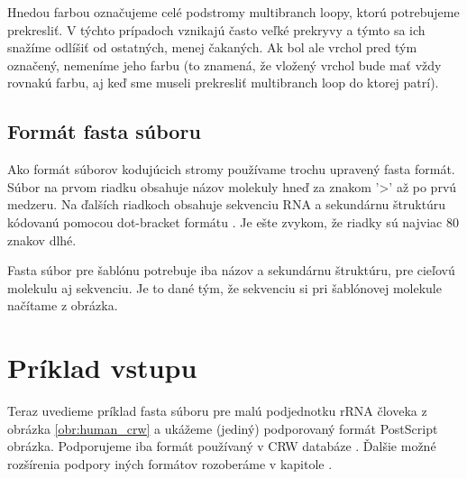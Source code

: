 Hnedou farbou označujeme celé podstromy multibranch loopy, ktorú potrebujeme
prekresliť. V týchto prípadoch vznikajú často veľké prekryvy a týmto
sa ich snažíme odlíšiť od ostatných, menej čakaných.
Ak bol ale vrchol pred tým označený, nemeníme jeho farbu (to znamená, že vložený vrchol
bude mať vždy rovnakú farbu, aj keď sme museli prekresliť multibranch loop do ktorej patrí).





\subsection{Formát fasta súboru}

Ako formát súborov kodujúcich stromy používame trochu upravený fasta formát.
Súbor na prvom riadku obsahuje názov molekuly hneď za znakom '>' až po prvú medzeru.
Na ďalších riadkoch obsahuje sekvenciu RNA a sekundárnu štruktúru kódovanú
pomocou dot-bracket formátu .
Je ešte zvykom, že riadky sú najviac 80 znakov dlhé.

Fasta súbor pre šablónu potrebuje iba názov a sekundárnu štruktúru,
pre cieľovú molekulu aj sekvenciu. Je to dané tým, že sekvenciu
si pri šablónovej molekule načítame z obrázka.



\section{Príklad vstupu}

Teraz uvedieme príklad fasta súboru pre malú podjednotku rRNA človeka z obrázka
\ref{obr:human_crw} a ukážeme (jediný) podporovaný formát PostScript obrázka.
Podporujeme iba formát používaný v CRW databáze .
Ďalšie možné rozšírenia podpory iných formátov rozoberáme v kapitole
.

